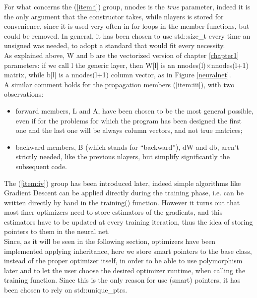 \documentclass[12pt, a4paper]{report}
\theoremstyle{definition}
\begin{document}
For what concerns the (\ref{item:i}) group, {\ttfamily nnodes} is the \textit{true} parameter, indeed it is the only argument that the constructor takes, while {\ttfamily nlayers} is stored for convenience, since it is used very often in for loops in the member functions, but could be removed. In general, it has been chosen to use {\ttfamily std::size\_t} every time an unsigned was needed, to adopt a standard that would fit every necessity.\\
As explained above, {\ttfamily W} and {\ttfamily b} are the vectorized version of chapter \ref{chapter1} parameters: if we call {\ttfamily l} the generic layer, then {\ttfamily W[l]} is an {\ttfamily nnodes(l)}$\times${\ttfamily nnodes(l+1)} matrix, while {\ttfamily b[l]} is a {\ttfamily nnodes(l+1)} column vector, as in Figure \ref{neuralnet}.\\
A similar comment holds for the propagation members (\ref{item:iii}), with two observations:
\begin{itemize}
	\item forward members, {\ttfamily L} and {\ttfamily A}, have been chosen to be the most general possible, even if for the problems for which the program has been designed the first one and the last one will be always column vectors, and not true matrices;
	\item backward members, {\ttfamily B} (which stands for ``backward''), {\ttfamily dW} and {\ttfamily db}, aren't strictly needed, like the previous {\ttfamily nlayers}, but simplify significantly the subsequent code.
\end{itemize}
The (\ref{item:iv}) group has been introduced later, indeed simple algorithms like Gradient Descent can be applied directly during the training phase, i.e. can be written directly by hand in the {\ttfamily training()} function. However it turns out that most finer optimizers need to store estimators of the gradients, and this estimators have to be updated at every training iteration, thus the idea of storing pointers to them in the neural net.\\
Since, as it will be seen in the following section, optimizers have been implemented applying inheritance, here we store smart pointers to the base class, instead of the proper optimizer itself, in order to be able to use polymorphism later and to let the user choose the desired optimizer runtime, when calling the training function. Since this is the only reason for use (smart) pointers, it has been chosen to rely on {\ttfamily std::unique\_ptr}s.\\
\end{document}
